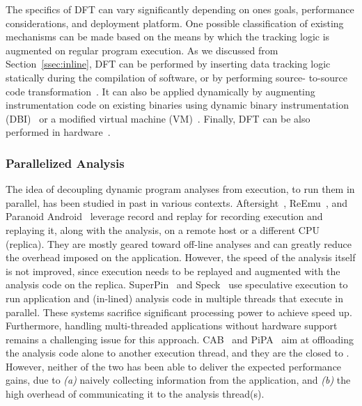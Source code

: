 The specifics of DFT can vary significantly depending on ones goals,
performance considerations, and deployment platform. One possible
classification of existing mechanisms can be made based on the means by which
the tracking logic is augmented on regular program execution. As we discussed
from Section~\ref{ssec:inline}, DFT can be performed by inserting data tracking
logic statically during the compilation of software, or by performing source-
to-source code transformation~\cite{txl, cil}. It can also be applied
dynamically by augmenting instrumentation code on existing binaries using
dynamic binary instrumentation (DBI)~\cite{pin:pldi2005, valgrind, dynamorio}
or a modified virtual machine (VM)~\cite{qemu:usenix05, xen:sosp2003}.
Finally, DFT can be also performed in hardware~\cite{raksha:isca2007,
lba:isca2008}.

\subsubsection{Parallelized Analysis}
\label{ssec:parallel}

The idea of decoupling dynamic program analyses from execution, to run them in
parallel, has been studied in past in various contexts. 
%
Aftersight~\cite{aftersight:atc2008}, ReEmu~\cite{reemu:ppopp2013}, and
Paranoid Android~\cite{paranoidandroid:acsac10} leverage record and replay for
recording execution and replaying it, along with the analysis, on a remote host
or a different CPU (replica). They are mostly geared toward off-line analyses
and can greatly reduce the overhead imposed on the application.  However, the
speed of the analysis itself is not improved, since execution needs to be
replayed and augmented with the analysis code on the replica.
SuperPin~\cite{superpin:cgo2007} and Speck~\cite{speck:asplos2008} use
speculative execution to run application and (in-lined) analysis code in
multiple threads that execute in parallel.  These systems sacrifice significant
processing power to achieve speed up.  Furthermore, handling multi-threaded
applications without hardware support remains a challenging issue for this
approach. CAB~\cite{cab:oopsala2009} and PiPA~\cite{pipa:cgo2008} aim at
offloading the analysis code alone to another execution thread, and they are
the closed to \sreplica. However, neither of the two has been able to deliver
the expected performance gains, due to {\it (a)} naively collecting information
from the application, and {\it (b)} the high overhead of communicating it to
the analysis thread(s). 

